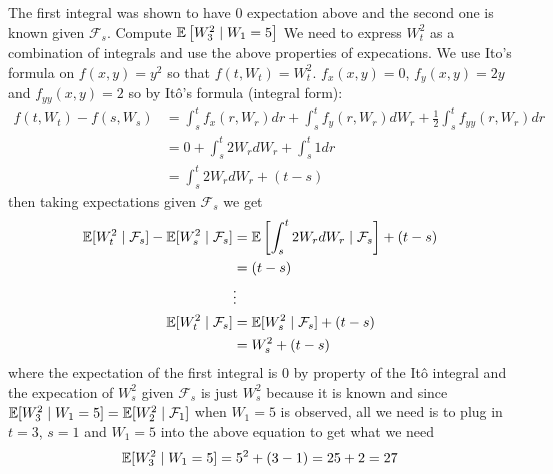 \documentclass[oneside]{book}
\begin{document}
    The first integral was shown to have 0 expectation above and the second one is known given $\mathcal{F}_s$.
    Compute $\mathbb{E}\left[W_3^2 \mid W_1 = 5\right]$
    We need to express $W_t^2$ as a combination of integrals and use the above properties of expecations. We use
    Ito's formula on $f(x,y) = y^2$ so that $f(t,W_t) = W_t^2$. $f_x(x,y) = 0$, $f_y(x,y) = 2y$ and $f_{yy}(x,y) = 2$ so
    by Itô's formula (integral form):
    \begin{align*}
        f(t, W_t) - f(s, W_s) &= \int_s^t f_x(r, W_r)dr + \int_s^t f_y(r, W_r)dW_r + \frac{1}{2}\int_s^t f_{yy}(r, W_r)dr \\
                              &= 0 + \int_s^t 2W_r dW_r + \int_s^t 1dr \\
                              &= \int_s^t 2W_r dW_r + (t-s)
    \end{align*}
    then taking expectations given $\mathcal{F}_s$ we get
    \begin{align*}
        \mathbb{E}[W_t^2 \mid \mathcal{F}_s] - \mathbb{E}[W_s^2 \mid \mathcal{F}_s] &= \mathbb{E}\left[\int_s^t 2W_r dW_r \mid \mathcal{F}_s\right] + (t-s) \\
                                                              &= (t-s) \\
                                                              &\vdots \\
        \mathbb{E}[W_t^2 \mid \mathcal{F}_s] &= \mathbb{E}[W_s^2 \mid \mathcal{F}_s] + (t-s) \\
                                  &= W_s^2 + (t-s) \\
    \end{align*}
    \renewcommand{\F}{\mathcal{F}}
    where the expectation of the first integral is 0 by property of the Itô integral and the expecation of $W_s^2$ given $\F_s$ is
    just $W_s^2$ because it is known and since $\E[W_3^2 \mid W_1 = 5] = \E[W_2^2 \mid \F_1]$ when $W_1 = 5$ is observed, all we need is
    to plug in $t=3$, $s=1$ and $W_1 = 5$ into the above equation to get what we need
    $$
        \mathbb{E}[W_3^2 \mid W_1 = 5] = 5^2 + (3-1) = 25 + 2 = 27
    $$
\end{document}
